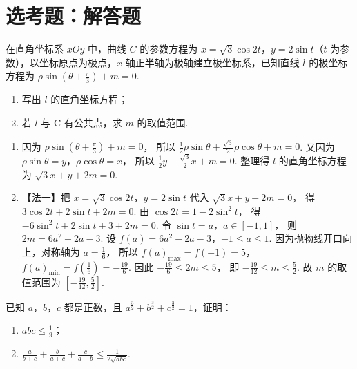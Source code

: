 \section{选考题：解答题}

\begin{problem}
在直角坐标系 \(xOy\) 中，曲线 \(C\) 的参数方程为 \(x=\sqrt{3}\cos 2t\)，\(y=2\sin t\)（\(t\) 为参数），以坐标原点为极点，\(x\) 轴正半轴为极轴建立极坐标系，已知直线 \(l\) 的极坐标方程为 \( \rho \sin \left( \theta+\frac{\pi}{3} \right)+m=0 \).
\begin{enumerate}
\item 写出 \(l\) 的直角坐标方程；
\item 若 \(l\) 与 C 有公共点，求 \(m\) 的取值范围.
\end{enumerate}
\end{problem}

\begin{solution}
\begin{enumerate}
\item 因为
\(\rho \sin \left( \theta+\frac{\pi}{3} \right)+m=0\)，
所以
\(\frac{1}{2}\rho \sin \theta+\frac{\sqrt{3}}{2}\rho \cos \theta+m=0\).
又因为
\(\rho \sin \theta=y\)，\(\rho \cos \theta=x\)，
所以
\(\frac{1}{2}y+\frac{\sqrt{3}}{2}x+m=0\).
整理得 \(l\) 的直角坐标方程为
\(\sqrt{3}x+y+2m=0\).

\item 【法一】把
\(x=\sqrt{3}\cos 2t\)，\(y=2\sin t\)
代入
\(\sqrt{3}x+y+2m=0\)，
得
\(3\cos 2t+2\sin t+2m=0\).
由
\(\cos 2t=1-2\sin^2 t\)，
得
\(-6\sin^2 t+2\sin t+3+2m=0\).
令
\(\sin t=a\)，\(a\in[-1,1]\)，
则
\(2m=6a^2-2a-3\).
设
\(f(a)=6a^2-2a-3\)，\(-1\le a\le 1\).
因为抛物线开口向上，对称轴为
\(a=\frac{1}{6}\)，
所以
\(f(a)_{\max}=f(-1)=5\)，\(f(a)_{\min}=f\left( \frac{1}{6} \right)=-\frac{19}{6}\).
因此
\(-\frac{19}{6}\le 2m\le 5\)，
即
\(-\frac{19}{12}\le m\le \frac{5}{2}\).
故 \(m\) 的取值范围为
\(\left[ -\frac{19}{12},\frac{5}{2} \right]\).
\end{enumerate}
\end{solution}

\begin{problem}
已知 \(a\)，\(b\)，\(c\) 都是正数，且 \(a^{\frac{3}{2}}+b^{\frac{3}{2}}+c^{\frac{3}{2}}=1\)，证明：
\begin{enumerate}
\item \(abc\le \frac{1}{9}\)；
\item \(\frac{a}{b+c}+\frac{b}{a+c}+\frac{c}{a+b}\le \frac{1}{2\sqrt{abc}}\).
\end{enumerate}
\end{problem}

